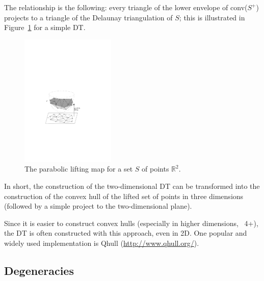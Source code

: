 The relationship is the following: every triangle of the lower envelope of conv($S^{+}$) projects to a triangle of the Delaunay triangulation of $S$; this is illustrated in Figure~\ref{fig:paraboloid} for a simple DT. 
\begin{figure}
  \centering
  \includegraphics[width=0.4\textwidth]{figs/paraboloid}
  \caption{The parabolic lifting map for a set $S$ of points $\mathbb{R}^2$.}
\label{fig:paraboloid}
\end{figure}

%

In short, the construction of the two-dimensional DT can be transformed into the construction of the convex hull of the lifted set of points in three dimensions (followed by a simple project to the two-dimensional plane).


\begin{practice-box}
Since it is easier to construct convex hulls (especially in higher dimensions, \ie\ 4+), the DT is often constructed with this approach, even in 2D. One popular and widely used implementation is Qhull (\url{http://www.qhull.org/}).
\end{practice-box}





%
\subsection{Degeneracies}
\label{sec:degeneracies}

